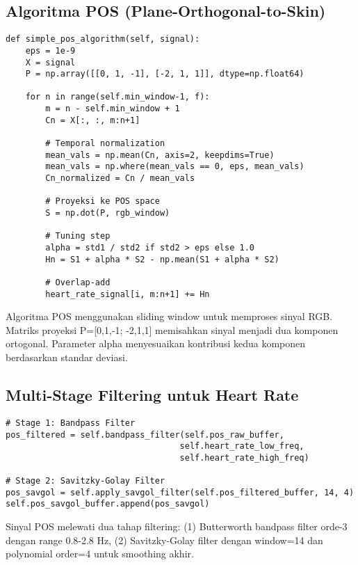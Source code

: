 \documentclass[11pt,a4paper]{article}
\begin{document}
\subsection{Algoritma POS (Plane-Orthogonal-to-Skin)}
    \begin{lstlisting}
def simple_pos_algorithm(self, signal):
    eps = 1e-9
    X = signal
    P = np.array([[0, 1, -1], [-2, 1, 1]], dtype=np.float64)
    
    for n in range(self.min_window-1, f):
        m = n - self.min_window + 1
        Cn = X[:, :, m:n+1]
        
        # Temporal normalization
        mean_vals = np.mean(Cn, axis=2, keepdims=True)
        mean_vals = np.where(mean_vals == 0, eps, mean_vals)
        Cn_normalized = Cn / mean_vals
        
        # Proyeksi ke POS space
        S = np.dot(P, rgb_window)
        
        # Tuning step
        alpha = std1 / std2 if std2 > eps else 1.0
        Hn = S1 + alpha * S2 - np.mean(S1 + alpha * S2)
        
        # Overlap-add
        heart_rate_signal[i, m:n+1] += Hn
    \end{lstlisting}
    Algoritma POS menggunakan sliding window untuk memproses sinyal RGB. Matriks proyeksi P=[0,1,-1; -2,1,1] memisahkan sinyal menjadi dua komponen ortogonal. Parameter alpha menyesuaikan kontribusi kedua komponen berdasarkan standar deviasi.

\subsection{Multi-Stage Filtering untuk Heart Rate}
    \begin{lstlisting}
# Stage 1: Bandpass Filter
pos_filtered = self.bandpass_filter(self.pos_raw_buffer, 
                                   self.heart_rate_low_freq, 
                                   self.heart_rate_high_freq)

# Stage 2: Savitzky-Golay Filter  
pos_savgol = self.apply_savgol_filter(self.pos_filtered_buffer, 14, 4)
self.pos_savgol_buffer.append(pos_savgol)
    \end{lstlisting}
    Sinyal POS melewati dua tahap filtering: (1) Butterworth bandpass filter orde-3 dengan range 0.8-2.8 Hz, (2) Savitzky-Golay filter dengan window=14 dan polynomial order=4 untuk smoothing akhir.
\end{document}
